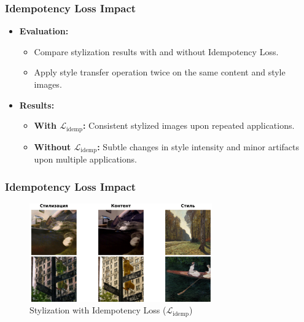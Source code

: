 \begin{frame}
\frametitle{Idempotency Loss Impact}

\begin{itemize}
    \item \textbf{Evaluation:}
    \begin{itemize}
        \item Compare stylization results with and without Idempotency Loss.
        \item Apply style transfer operation twice on the same content and style images.
    \end{itemize}
    \item \textbf{Results:}
    \begin{itemize}
        \item \textbf{With \( \mathcal{L}_{\text{idemp}} \):} Consistent stylized images upon repeated applications.
        \item \textbf{Without \( \mathcal{L}_{\text{idemp}} \):} Subtle changes in style intensity and minor artifacts upon multiple applications.
    \end{itemize}
\end{itemize}   

\end{frame}

\begin{frame}
\frametitle{Idempotency Loss Impact}

\begin{figure}[H]
    \centering
    \includegraphics[width=0.7\textwidth]{figures/idempotency.png}
    \caption{Stylization with Idempotency Loss (\( \mathcal{L}_{\text{idemp}} \))}
    \label{fig:idempotency_result}
\end{figure}

\end{frame}

